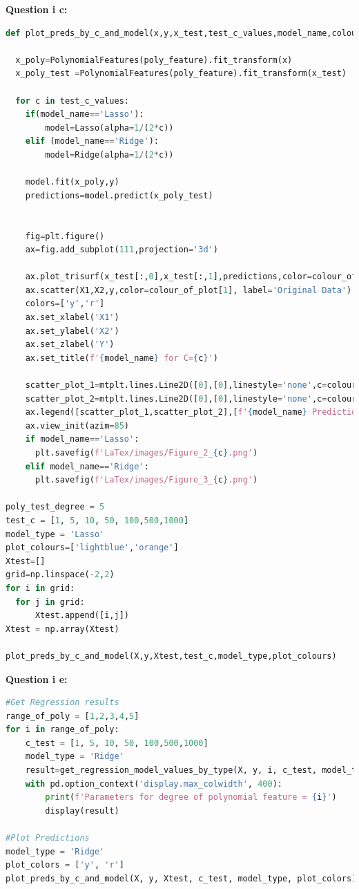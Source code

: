 \documentclass[10pt]{article}
\begin{document}
\textbf {Question i c:}
\begin{lstlisting}[language=Python]
  def plot_preds_by_c_and_model(x,y,x_test,test_c_values,model_name,colour_of_plot):

  x_poly=PolynomialFeatures(poly_feature).fit_transform(x)
  x_poly_test =PolynomialFeatures(poly_feature).fit_transform(x_test)

  for c in test_c_values:
    if(model_name=='Lasso'):
        model=Lasso(alpha=1/(2*c))
    elif (model_name=='Ridge'):
        model=Ridge(alpha=1/(2*c))

    model.fit(x_poly,y)
    predictions=model.predict(x_poly_test)
    

    fig=plt.figure()
    ax=fig.add_subplot(111,projection='3d')

    ax.plot_trisurf(x_test[:,0],x_test[:,1],predictions,color=colour_of_plot[0],alpha=0.5)
    ax.scatter(X1,X2,y,color=colour_of_plot[1], label='Original Data')
    colors=['y','r']
    ax.set_xlabel('X1')
    ax.set_ylabel('X2')
    ax.set_zlabel('Y')
    ax.set_title(f'{model_name} for C={c}')

    scatter_plot_1=mtplt.lines.Line2D([0],[0],linestyle='none',c=colour_of_plot[0],marker='o')
    scatter_plot_2=mtplt.lines.Line2D([0],[0],linestyle='none',c=colour_of_plot[1],marker='^')
    ax.legend([scatter_plot_1,scatter_plot_2],[f'{model_name} Prediction','Original Data'],numpoints=1)
    ax.view_init(azim=85)
    if model_name=='Lasso':
      plt.savefig(f'LaTex/images/Figure_2_{c}.png')
    elif model_name=='Ridge':
      plt.savefig(f'LaTex/images/Figure_3_{c}.png')

poly_test_degree = 5 
test_c = [1, 5, 10, 50, 100,500,1000]
model_type = 'Lasso'
plot_colours=['lightblue','orange']
Xtest=[]
grid=np.linspace(-2,2)
for i in grid:
  for j in grid:
      Xtest.append([i,j])
Xtest = np.array(Xtest)

plot_preds_by_c_and_model(X,y,Xtest,test_c,model_type,plot_colours)
\end{lstlisting}
\textbf{Question i e:}
\begin{lstlisting}[language=Python]
  #Get Regression results
range_of_poly = [1,2,3,4,5] 
for i in range_of_poly:
    c_test = [1, 5, 10, 50, 100,500,1000]
    model_type = 'Ridge'
    result=get_regression_model_values_by_type(X, y, i, c_test, model_type)
    with pd.option_context('display.max_colwidth', 400):
        print(f'Parameters for degree of polynomial feature = {i}')
        display(result)

#Plot Predictions 
model_type = 'Ridge'
plot_colors = ['y', 'r']
plot_preds_by_c_and_model(X, y, Xtest, c_test, model_type, plot_colors)
\end{lstlisting}
\end{document}
